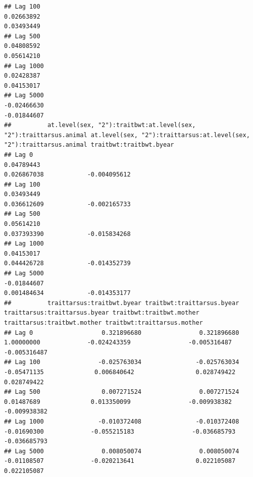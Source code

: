 \documentclass[
  12pt,
]{book}
\begin{document}
\begin{verbatim}
## Lag 100                                                      0.02663892                                                        0.03493449
## Lag 500                                                      0.04808592                                                        0.05614210
## Lag 1000                                                     0.02428387                                                        0.04153017
## Lag 5000                                                    -0.02466630                                                       -0.01844607
##          at.level(sex, "2"):traitbwt:at.level(sex, "2"):traittarsus.animal at.level(sex, "2"):traittarsus:at.level(sex, "2"):traittarsus.animal traitbwt:traitbwt.byear
## Lag 0                                                           0.04789443                                                          0.026867038            -0.004095612
## Lag 100                                                         0.03493449                                                          0.036612609            -0.002165733
## Lag 500                                                         0.05614210                                                          0.037393390            -0.015834268
## Lag 1000                                                        0.04153017                                                          0.044426728            -0.014352739
## Lag 5000                                                       -0.01844607                                                          0.001484634            -0.014353177
##          traittarsus:traitbwt.byear traitbwt:traittarsus.byear traittarsus:traittarsus.byear traitbwt:traitbwt.mother traittarsus:traitbwt.mother traitbwt:traittarsus.mother
## Lag 0                   0.321896680                0.321896680                    1.00000000             -0.024243359                -0.005316487                -0.005316487
## Lag 100                -0.025763034               -0.025763034                   -0.05471135              0.006840642                 0.028749422                 0.028749422
## Lag 500                 0.007271524                0.007271524                    0.01487689              0.013350099                -0.009938382                -0.009938382
## Lag 1000               -0.010372408               -0.010372408                   -0.01690300             -0.055215183                -0.036685793                -0.036685793
## Lag 5000                0.008050074                0.008050074                   -0.01108507             -0.020213641                 0.022105087                 0.022105087

\end{verbatim}
\end{document}
